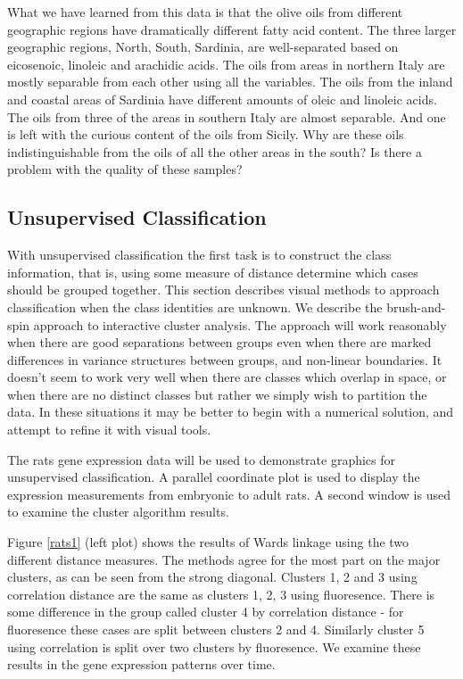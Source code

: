 \documentclass{article}
\begin{document}

What we have learned from this data is that the olive oils from
different geographic regions have dramatically different fatty acid
content. The three larger geographic regions, North, South, Sardinia,
are well-separated based on eicosenoic, linoleic and arachidic acids.
The oils from areas in northern Italy are mostly separable from each
other using all the variables. The oils from the inland and coastal
areas of Sardinia have different amounts of oleic and linoleic
acids. The oils from three of the areas in southern Italy are almost
separable. And one is left with the curious content of the oils from
Sicily. Why are these oils indistinguishable from the oils of all the
other areas in the south? Is there a problem with the quality of these
samples?

\subsection{Unsupervised Classification}

With unsupervised classification the first task is to construct the
class information, that is, using some measure of distance determine
which cases should be grouped together. This section describes visual
methods to approach classification when the class identities are
unknown. We describe the brush-and-spin approach to interactive
cluster analysis. The approach will work reasonably when there are
good separations between groups even when there are marked differences
in variance structures between groups, and non-linear boundaries. It
doesn't seem to work very well when there are classes which overlap in
space, or when there are no distinct classes but rather we simply wish
to partition the data. In these situations it may be better to begin
with a numerical solution, and attempt to refine it with visual tools.

The rats gene expression data will be used to demonstrate graphics for
unsupervised classification. A parallel coordinate plot is used to
display the expression measurements from embryonic to adult rats. A
second window is used to examine the cluster algorithm results.

Figure \ref{rats1} (left plot) shows the results of Wards linkage
using the two different distance measures. The methods agree for the
most part on the major clusters, as can be seen from the strong
diagonal. Clusters 1, 2 and 3 using correlation distance are the same
as clusters 1, 2, 3 using fluoresence. There is some difference in the
group called cluster 4 by correlation distance - for fluoresence these
cases are split between clusters 2 and 4. Similarly cluster 5 using
correlation is split over two clusters by fluoresence. We examine
these results in the gene expression patterns over time.
\end{document}
